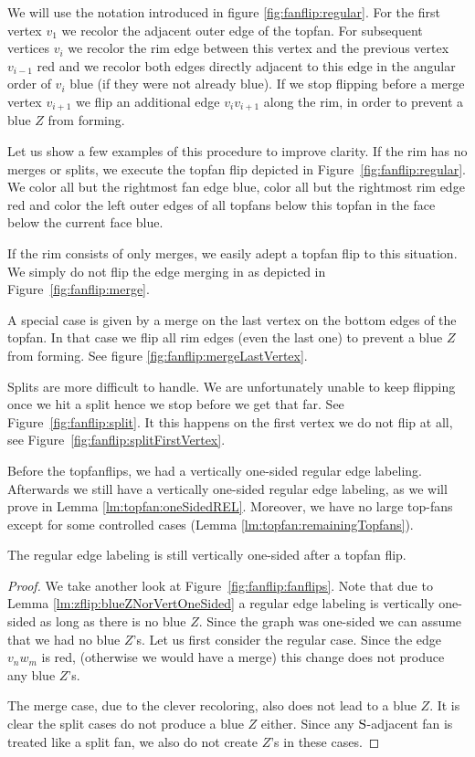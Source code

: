   We will use the notation introduced in figure \ref{fig:fanflip:regular}.
  For the first vertex $v_1$ we recolor the adjacent outer edge of the topfan. For subsequent vertices $v_i$ we recolor the rim edge between this vertex and the previous vertex $v_{i-1}$ red and we recolor both edges directly adjacent to this edge in the angular order of $v_i$ blue (if they were not already blue).
  If we stop flipping before a merge vertex $v_{i+1}$ we flip an additional edge $v_i v_{i+1}$ along the rim, in order to prevent a blue $Z$ from forming.

  Let us show a few examples of this procedure to improve clarity.
  If the rim has no merges or splits, we execute the topfan flip depicted in Figure~\ref{fig:fanflip:regular}.
  We color all but the rightmost fan edge blue, color all but the rightmost rim edge red and color the left outer edges of all topfans below this topfan in the face below the current face blue.

  If the rim consists of only merges, we easily adept a topfan flip to this situation. We simply do not flip the edge merging in as depicted in Figure~\ref{fig:fanflip:merge}.

  A special case is given by a merge on the last vertex on the bottom edges of the topfan. In that case we flip all rim edges (even the last one) to prevent a blue $Z$ from forming. See figure \ref{fig:fanflip:mergeLastVertex}.

  Splits are more difficult to handle. We are unfortunately unable to keep flipping once we hit a split hence we stop before we get that far. See Figure~\ref{fig:fanflip:split}. It this happens on the first vertex we do not flip at all, see Figure~\ref{fig:fanflip:splitFirstVertex}.

Before the topfanflips, we had a vertically one-sided regular edge labeling. Afterwards we still have a vertically one-sided regular edge labeling, as we will prove in Lemma \ref{lm:topfan:oneSidedREL}. Moreover, we have no large top-fans except for some controlled cases (Lemma \ref{lm:topfan:remainingTopfans}).

\begin{lemma}
  \label{lm:topfan:oneSidedREL}
  The regular edge labeling is still vertically one-sided after a topfan flip.
\end{lemma}
\begin{proof}
  We take another look at Figure~\ref{fig:fanflip:fanflips}. Note that due to Lemma \ref{lm:zflip:blueZNorVertOneSided} a regular edge labeling is vertically one-sided as long as there is no blue $Z$.  Since the graph was one-sided we can assume that we had no blue $Z$'s.
  Let us first consider the regular case. Since the edge  $v_n w_m$ is red, (otherwise we would have a merge) this change does not produce any blue $Z$'s.

  The merge case, due to the clever recoloring, also does not lead to a blue $Z$.
  It is clear the split cases do not produce a blue $Z$ either.
  Since any $\mathrm{S}$-adjacent fan is treated like a split fan, we also do not create $Z$'s in these cases.
\end{proof}


